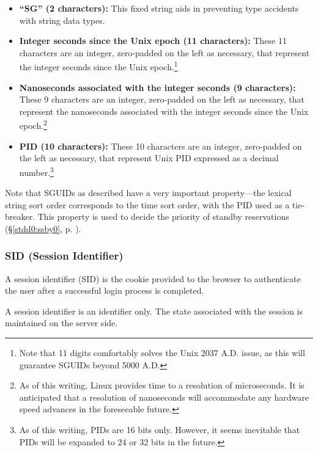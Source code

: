 \documentclass[letterpaper,10pt,titlepage]{article}
\begin{document}
\begin{itemize}
\item \textbf{``SG'' (2 characters):}
      This fixed string aids in preventing type accidents with
      string data types.
\item \textbf{Integer seconds since the Unix epoch (11 characters):}
      These 11 characters are an integer, zero-padded on the left as
      necessary, that represent the integer seconds since the Unix
      epoch.\footnote{Note that 11 digits comfortably solves the Unix
      2037 A.D. issue, as this will guarantee SGUIDs 
      beyond 5000 A.D.}
\item \textbf{Nanoseconds associated with the integer seconds (9 characters):}
      These 9 characters are an integer, zero-padded on the left as
      necessary, that represent the nanoseconds associated with the
      integer seconds since the Unix
      epoch.\footnote{As of this writing, Linux provides time to a resolution
      of microseconds.  It is anticipated that a resolution of nanoseconds will
      accommodate any hardware speed advances in the foreseeable future.}  
\item \textbf{PID (10 characters):}
      These 10 characters are an integer, zero-padded on the left as
      necessary, that represent Unix PID expressed 
      as a decimal number.\footnote{As of this writing, PIDs are 16 bits only.
      However, it seems inevitable that PIDs will be expanded to 24 or 32 bits in the 
      future.}  
\end{itemize}

Note that SGUIDs as described have a very important property---the lexical
string sort order corresponds to the time sort order, with the PID used as a tie-breaker.
This property is used to decide the priority of standby reservations 
(\S{}\ref{stdd0:ssby0}, p. \pageref{stdd0:ssby0}).


\subsubsection{SID (Session Identifier)}
\label{stdd0:sdty0:ssid0}

A session identifier (SID) is the
cookie provided to the browser to authenticate the user after a successful login
process is completed.

A session identifier is an identifier only.  The state associated with the
session is maintained on the server side.
\end{document}
